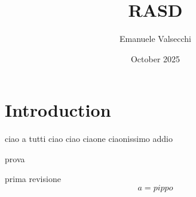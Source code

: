 \documentclass{article}
\title{RASD}
\author{Emanuele Valsecchi}
\date{October 2025}
\begin{document}
\maketitle

\section{Introduction}

ciao a tutti
ciao ciao
ciaone
ciaonissimo
addio


prova



prima revisione\begin{equation}
    a = pippo
\end{equation}
\end{document}
